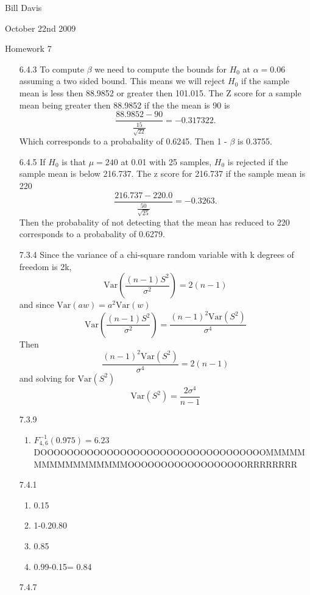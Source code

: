 \documentclass[11pt,fleqn]{article}
\begin{document}
\newcommand{\mbf}[1]{\mbox{{\bfseries #1}}}
\newcommand{\N}{\mbf{N}}
\renewcommand{\O}{\mbf{O}}
\newcommand{\tabfrac}[2]{%
	\setlength{\fboxrule}{0pt}%
	\fbox{$\frac{#1}{#2}$}%
}

\noindent Bill Davis 

\noindent October 22nd 2009 

\noindent Homework 7

\begin{enumerate}

\item[6.4.3]
To compute $\beta$ we need to compute the bounds for $H_0$ at $\alpha=0.06$
assuming a two sided bound. This means we will reject $H_0$ if the sample mean
is less then 88.9852 or greater then 101.015. The Z score for a sample
mean being greater then 88.9852 if the the mean is 90 is 
\[
\frac{88.9852 - 90}{\frac{15}{\sqrt{22}}} = -0.317322. 
\]
Which corresponds to a probabality of 0.6245. Then 1 - $\beta$ is 0.3755.
\item[6.4.5]
If $H_0$ is that $\mu=240$ at 0.01 with 25 samples, $H_0$ is rejected if the
sample mean is below 216.737. The z score for 216.737 if the sample mean is 220
\[
\frac{216.737 - 220.0}{\frac{50}{\sqrt{25}}} = -0.3263. 
\]
Then the probabality of not detecting that the mean has reduced to 220
corresponds to a probabality of 0.6279.
\item[7.3.4]
Since the variance of a chi-square random variable with k degrees of freedom is
2k, 
\[
\mathrm{Var}(\frac{(n-1)S^2}{\sigma^2}) = 2(n-1)
\]
and since $\mathrm{Var}(aw) = a^2\mathrm{Var}(w)$
\[
\mathrm{Var}(\frac{(n-1)S^2}{\sigma^2}) = \frac{(n-1)^2
\mathrm{Var}(S^2)}{\sigma^4}
\]
Then 
\[
\frac{(n-1)^2 \mathrm{Var}(S^2)}{\sigma^4}= 2(n-1) 
\]
and solving for $\mathrm{Var}(S^2)$
\[
\mathrm{Var}(S^2) = \frac{2\sigma^4}{n-1}
\]
\item[7.3.9]
\begin{enumerate}
  \item $F^{-1}_{4,6}(0.975) = 6.23$
  DOOOOOOOOOOOOOOOOOOOOOOOOOOOOOOOOOOMMMMMMMMMMMMMMMMMOOOOOOOOOOOOOOOOOORRRRRRRR
\end{enumerate}
\item[7.4.1]
\begin{enumerate}
  \item 0.15
  \item 1-0.20.80
  \item 0.85
  \item 0.99-0.15= 0.84
\end{enumerate}
\item[7.4.7]

\end{enumerate}
\end{document}
